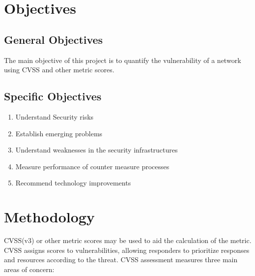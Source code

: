 \documentclass{article}
\begin{document}
\section{Objectives}
\subsection{General Objectives}
The main objective of this project is to quantify the vulnerability of a network using CVSS and other metric scores.
\subsection{Specific Objectives}
\begin{enumerate}
\item Understand Security risks 
\item Establish emerging problems
\item Understand weaknesses in the security infrastructures
\item Measure performance of counter measure processes
\item Recommend technology improvements
\end{enumerate}

\section{Methodology}
CVSS(v3) or other metric scores may be used to aid the calculation of the metric. 
CVSS assigns scores to vulnerabilities, allowing responders to prioritize responses and resources according to the threat. CVSS assessment measures three main areas of concern:
\end{document}
